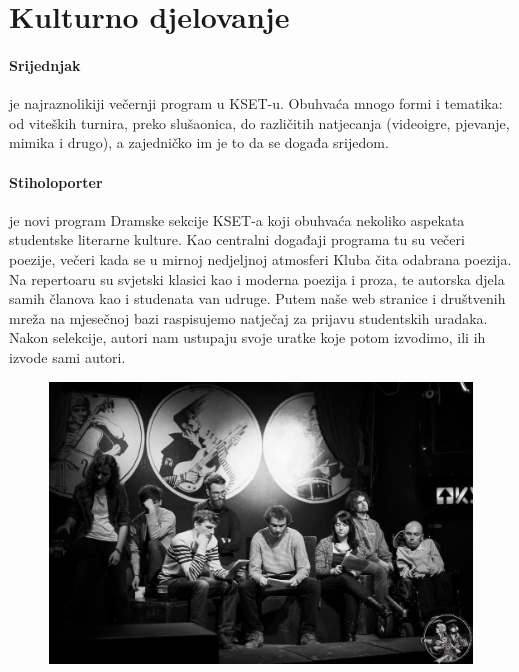 \documentclass[12pt,a4paper,oneside]{article}
\begin{document}
	
\section*{Kulturno djelovanje}

	\paragraph{Srijednjak}je najraznolikiji večernji program u KSET-u. Obuhvaća mnogo formi i tematika: od viteških turnira, preko slušaonica, do različitih natjecanja (videoigre, pjevanje, mimika i drugo), a zajedničko im je to da se događa srijedom.

	\paragraph{Stiholoporter}je novi program Dramske sekcije KSET-a koji obuhvaća nekoliko aspekata studentske literarne kulture. Kao centralni događaji programa tu su večeri poezije, večeri kada se u mirnoj  nedjeljnoj atmosferi Kluba čita odabrana poezija. Na repertoaru su svjetski klasici kao i moderna poezija i proza, te autorska djela samih članova kao i studenata van udruge. Putem naše web stranice i društvenih mreža na mjesečnoj bazi raspisujemo natječaj za prijavu studentskih uradaka. Nakon selekcije, autori nam ustupaju svoje uratke koje potom izvodimo, ili ih izvode sami autori.
	
	\begin{figure}[h!]
		\centering
		\vspace{5mm}
		\includegraphics[scale=0.3]{stiholoporter.jpg}	
	\end{figure}
	
\end{document}
